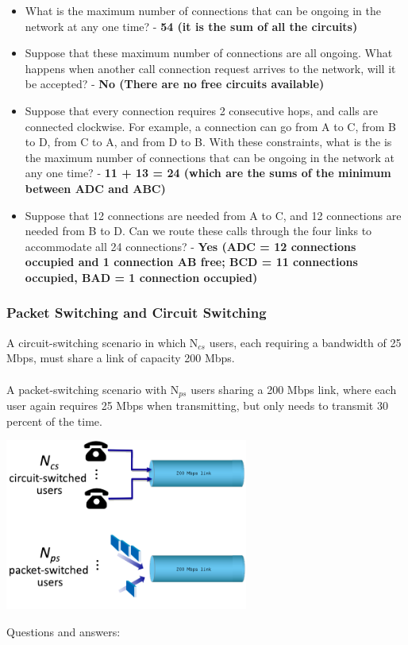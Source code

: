 \documentclass{article}
\begin{document}
\begin{itemize}
	\item What is the maximum number of connections that can be ongoing in the network at any one time? - \textbf{54 (it is the sum of all the circuits)}
	\item Suppose that these maximum number of connections are all ongoing. What happens when another call connection request arrives to the network, will it be accepted? - \textbf{No (There are no free circuits available)}
	\item Suppose that every connection requires 2 consecutive hops, and calls are connected clockwise. For example, a connection can go from A to C, from B to D, from C to A, and from D to B. With these constraints, what is the is the maximum number of connections that can be ongoing in the network at any one time? - \textbf{11 + 13 = 24 (which are the sums of the minimum between ADC and ABC)}
	\item Suppose that 12 connections are needed from A to C, and 12 connections are needed from B to D. Can we route these calls through the four links to accommodate all 24 connections? - \textbf{Yes (ADC = 12 connections occupied and 1 connection AB free; BCD = 11 connections occupied, BAD = 1 connection occupied)}
\end{itemize}

\subsubsection{Packet Switching and Circuit Switching}
A circuit-switching scenario in which  N$_{cs}$  users, each requiring a bandwidth of 25 Mbps, must share a link of capacity 200 Mbps. \\ \\
A packet-switching scenario with  N$_{ps}$  users sharing a 200 Mbps link, where each user again requires 25 Mbps when transmitting, but only needs to transmit 30 percent of the time. \\

\centerline{\includegraphics[width=8cm]{./assets/ex2}}
\noindent Questions and answers:
\end{document}
